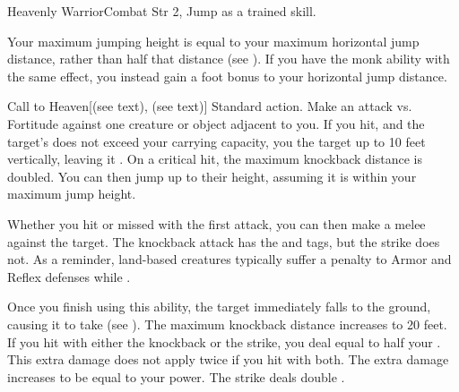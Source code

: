   \begin{feat}{Heavenly Warrior}{Combat}
    \featpre Str 2, Jump as a trained skill.

     Your maximum jumping height is equal to your maximum horizontal jump distance, rather than half that distance (see ).
    If you have the  monk ability with the same effect, you instead gain a  foot bonus to your horizontal jump distance.

    \begin{activeability}{Call to Heaven}[\atBrawling (see text), \atSizeBased (see text)]
      \abilityusagetime Standard action.
      \rankline
      Make an attack vs. Fortitude against one creature or object adjacent to you.
      If you hit, and the target's  does not exceed your carrying capacity, you  the target up to 10 feet vertically, leaving it .
      On a critical hit, the maximum knockback distance is doubled.
      You can then jump up to their height, assuming it is within your maximum jump height.

      Whether you hit or missed with the first attack, you can then make a melee  against the target.
      The knockback attack has the \atBrawling and \atSizeBased tags, but the strike does not.
      As a reminder, land-based creatures typically suffer a  penalty to Armor and Reflex defenses while .

      Once you finish using this ability, the target immediately falls to the ground, causing it to take  (see ).
      \rankline
       The maximum knockback distance increases to 20 feet.
       If you hit with either the knockback or the strike, you deal  equal to half your .
      This extra damage does not apply twice if you hit with both.
       The extra damage increases to be equal to your power.
       The strike deals double .
    \end{activeability}


\end{feat}
